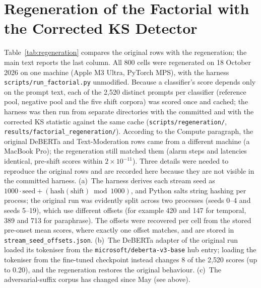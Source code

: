 \documentclass{article}
\begin{document}
\section{Regeneration of the Factorial with the Corrected KS Detector}
\label{app:regeneration}

Table~\ref{tab:regeneration} compares the original rows with the regeneration; the main text reports the last column. All 800 cells were regenerated on 18 October 2026 on one machine (Apple M3 Ultra, PyTorch MPS), with the harness \texttt{scripts/run\_factorial.py} unmodified. Because a classifier's score depends only on the prompt text, each of the 2{,}520 distinct prompts per classifier (reference pool, negative pool and the five shift corpora) was scored once and cached; the harness was then run from separate directories with the committed and with the corrected KS statistic against the same cache (\texttt{scripts/regeneration/}, \texttt{results/factorial\_regeneration/}). According to the Compute paragraph, the original DeBERTa and Text-Moderation rows came from a different machine (a MacBook Pro); the regeneration still matched them (alarm steps and latencies identical, pre-shift scores within $2\times10^{-11}$). Three details were needed to reproduce the original rows and are recorded here because they are not visible in the committed harness. (a)~The harness derives each stream seed as $1000\cdot\text{seed} + (\text{hash}(\text{shift})\bmod 1000)$, and Python salts string hashing per process; the original run was evidently split across two processes (seeds 0--4 and seeds 5--19), which use different offsets (for example 420 and 147 for temporal, 389 and 713 for paraphrase). The offsets were recovered per cell from the stored pre-onset mean scores, where exactly one offset matches, and are stored in \texttt{stream\_seed\_offsets.json}. (b)~The DeBERTa adapter of the original run loaded its tokeniser from the \texttt{microsoft/deberta-v3-base} hub entry; loading the tokeniser from the fine-tuned checkpoint instead changes 8 of the 2{,}520 scores (up to 0.20), and the regeneration restores the original behaviour. (c)~The adversarial-suffix corpus has changed since May (see above).
\end{document}

